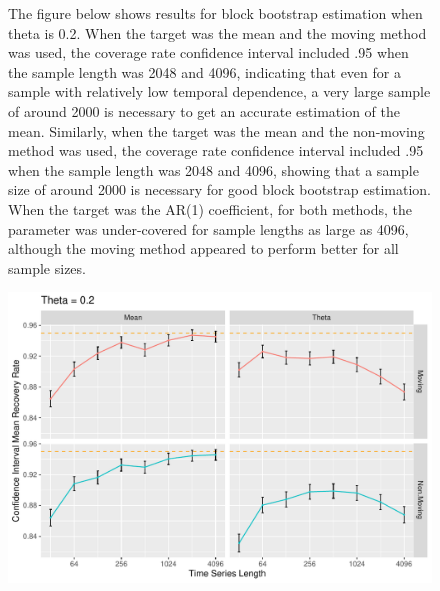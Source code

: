 \documentclass[12pt, letterpaper, titlepage]{article}
\begin{document}
\begin{figure}[tbp]
\caption{The figure below shows results for block bootstrap estimation when theta is 0.2. When the target was the mean and the moving method was used, the coverage rate confidence interval included .95 when the sample length was 2048 and 4096, indicating that even for a sample with relatively low temporal dependence, a very large sample of around 2000 is necessary to get an accurate estimation of the mean. Similarly, when the target was the mean and the non-moving method was used, the coverage rate confidence interval included .95 when the sample length was 2048 and 4096, showing that a sample size of around 2000 is necessary for good block bootstrap estimation. When the target was the AR(1) coefficient, for both methods, the parameter was under-covered for sample lengths as large as 4096, although the moving method appeared to perform better for all sample sizes. }
  \centering
  \includegraphics[width=\textwidth]{theta_0.2}
  \caption{}
  \label{fig:theta_0.2}
\end{figure}
\end{document}
